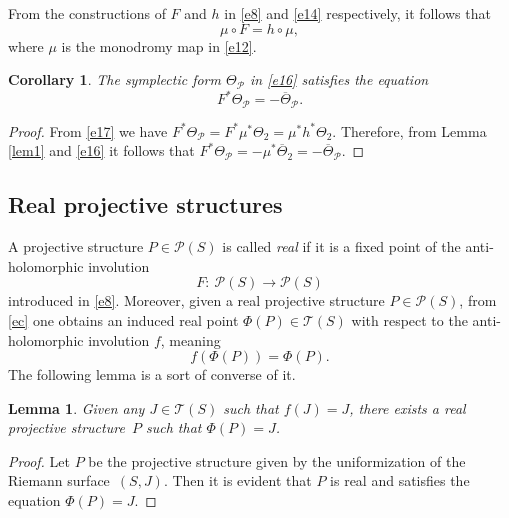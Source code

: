 \documentclass[10pt,a4paper]{amsart}
\numberwithin{equation}{section}
\newtheorem{Corollary}[Theorem]{Corollary}
\newtheorem{Lemma}[Theorem]{Lemma}
\begin{document}
\begin{Remark}From the constructions of $F$ and $h$ in \eqref{e8} and \eqref{e14} respectively, it follows that
\begin{equation}\label{e17}
\mu \circ F = h\circ\mu,
\end{equation}
where $\mu$ is the monodromy map in \eqref{e12}.\end{Remark}

\begin{Corollary}\label{cor1}
The symplectic form $\Theta_{\mathcal P}$ in \eqref{e16} satisfies the equation
\[
F^*\Theta_{\mathcal P} = -\overline{\Theta}_{\mathcal P}.
\]
\end{Corollary}

\begin{proof}
{}From \eqref{e17} we have $F^*\Theta_{\mathcal P} = F^*\mu^*\Theta_2 = \mu^*h^*
\Theta_2$. Therefore, from Lemma \ref{lem1} and \eqref{e16} it follows that $F^*
\Theta_{\mathcal P} = -\mu^*\overline{\Theta}_2 = -\overline{\Theta}_{\mathcal P}$.
\end{proof}

\subsection{Real projective structures}

A projective structure $P \in {\mathcal P}(S)$ is called \textit{real} if it is a fixed point of the anti-holomorphic involution
\[F\colon\ {\mathcal P}(S) \longrightarrow {\mathcal P}(S)\]
introduced in \eqref{e8}. Moreover, given a real projective structure $P \in {\mathcal P}(S)$, from \eqref{ec} one obtains an
induced real point $\Phi(P) \in {\mathcal T}(S)$ with respect to the anti-holomorphic involution $f$, meaning
\[
f(\Phi(P)) = \Phi(P).
\]
The following lemma is a sort of converse of it.

\begin{Lemma}\label{lem2}
Given any $J \in {\mathcal T}(S)$ such that $f(J) = J$, there exists a real projective structure~$P$
such that $\Phi(P) = J$.
\end{Lemma}

\begin{proof}
Let $P$ be the projective structure given by the uniformization of the Riemann surface~$(S, J)$. Then it
is evident that $P$ is real and satisfies the equation $\Phi(P) = J$.
\end{proof}
\end{document}
